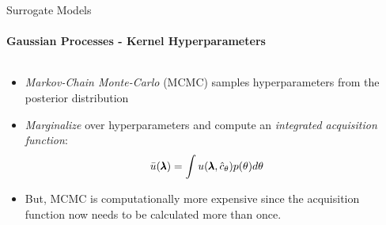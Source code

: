 \begin{frame}[c]{Surrogate Models}
\framesubtitle{Gaussian Processes - Kernel Hyperparameters}

\begin{columns}[T] %
\begin{column}{.6\textwidth}
\begin{itemize}
    \item<+-> \emph{Markov-Chain Monte-Carlo} (MCMC) samples hyperparameters from the posterior distribution
    \item<+-> \emph{Marginalize} over hyperparameters and compute an \emph{integrated acquisition function}:
        \begin{equation*}
        \begin{aligned}
            \Bar{u}(\pmb{\lambda}) = \int u (\pmb{\lambda}, \hat{c}_\theta)p(\theta)d\theta
        \end{aligned}
        \end{equation*}
    \item<+-> But, MCMC is computationally more expensive since the acquisition function now needs to be calculated more than once.
\end{itemize}
\end{column}
%
\begin{column}{.4\textwidth}
\end{column}

\end{columns}

\end{frame}
